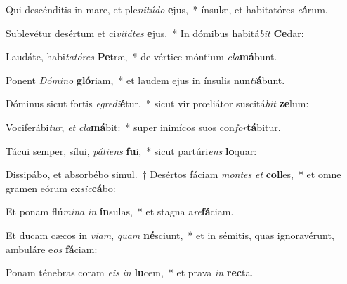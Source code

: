 \item Qui descénditis in mare, et ple\textit{ni}\textit{tú}\textit{do} \textbf{e}jus,~* ínsulæ, et habitatóres \textit{e}\textbf{á}rum.
\item Sublevétur desértum et ci\textit{vi}\textit{tá}\textit{tes} \textbf{e}jus.~* In dómibus habitá\textit{bit} \textbf{Ce}dar:
\item Laudáte, habi\textit{ta}\textit{tó}\textit{res} \textbf{Pe}træ,~* de vértice móntium \textit{cla}\textbf{má}bunt.
\item Ponent \textit{Dó}\textit{mi}\textit{no} \textbf{gló}riam,~* et laudem ejus in ínsulis nun\textit{ti}\textbf{á}bunt.
\item Dóminus sicut fortis \textit{e}\textit{gre}\textit{di}\textbf{é}tur,~* sicut vir prœliátor suscitá\textit{bit} \textbf{ze}lum:
\item Vociferábi\textit{tur}, \textit{et} \textit{cla}\textbf{má}bit:~* super inimícos suos con\textit{for}\textbf{tá}bitur.
\item Tácui semper, sílui, \textit{pá}\textit{ti}\textit{ens} \textbf{fu}i,~* sicut partúri\textit{ens} \textbf{lo}quar:
\item Dissipábo, et absorbébo simul.~† Desértos fáciam \textit{mon}\textit{tes} \textit{et} \textbf{col}les,~* et omne gramen eórum ex\textit{sic}\textbf{cá}bo:
\item Et ponam flú\textit{mi}\textit{na} \textit{in} \textbf{ín}sulas,~* et stagna a\textit{re}\textbf{fá}ciam.
\item Et ducam cæcos in \textit{vi}\textit{am}, \textit{quam} \textbf{né}sciunt,~* et in sémitis, quas ignoravérunt, ambuláre e\textit{os} \textbf{fá}ciam:
\item Ponam ténebras coram \textit{e}\textit{is} \textit{in} \textbf{lu}cem,~* et prava \textit{in} \textbf{rec}ta.
